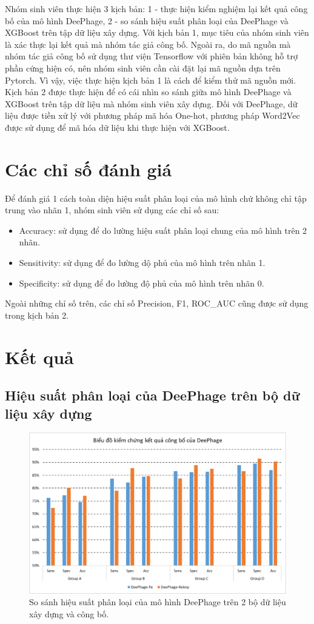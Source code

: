 Nhóm sinh viên thực hiện 3 kịch bản: 1 - thực hiện kiểm nghiệm lại kết quả công bố của mô hình DeePhage, 2 - so sánh hiệu suất phân loại của DeePhage và XGBoost trên tập dữ liệu xây dựng. Với kịch bản 1, mục tiêu của nhóm sinh viên là xác thực lại kết quả mà nhóm tác giả công bố. Ngoài ra, do mã nguồn mà nhóm tác giả công bố sử dụng thư viện Tensorflow với phiên bản không hỗ trợ phần cứng hiện có, nên nhóm sinh viên cần cài đặt lại mã nguồn dựa trên Pytorch. Vì vậy, việc thực hiện kịch bản 1 là cách để kiểm thử mã nguồn mới. Kịch bản 2 được thực hiện để có cái nhìn so sánh giữa mô hình DeePhage và XGBoost trên tập dữ liệu mà nhóm sinh viên xây dựng. Đối với DeePhage, dữ liệu được tiền xử lý với phương pháp mã hóa One-hot, phương pháp Word2Vec được sử dụng để mã hóa dữ liệu khi thực hiện với XGBoost.

\section{Các chỉ số đánh giá}
Để đánh giá 1 cách toàn diện hiệu suất phân loại của mô hình chứ không chỉ tập trung vào nhãn 1, nhóm sinh viên sử dụng các chỉ số sau:
\begin{itemize}
    \item Accuracy: sử dụng để do lường hiệu suất phân loại chung của mô hình trên 2 nhãn.
    \item Sensitivity: sử dụng để đo lường dộ phủ của mô hình trên nhãn 1.
    \item Specificity: sử dụng để đo lường độ phủ của mô hình trên nhãn 0.
\end{itemize}
Ngoài những chỉ số trên, các chỉ số Precision, F1, ROC\_AUC cũng được sử dụng trong kịch bản 2.

\section{Kết quả}
\subsection{Hiệu suất phân loại của DeePhage trên bộ dữ liệu xây dựng}

\begin{figure}[H]
    \centering
    \includegraphics[width=1\linewidth]{figures/result_verify_deephage.png}
    \caption{So sánh hiệu suất phân loại của mô hình DeePhage trên 2 bộ dữ liệu xây dựng và công bố.}
    \label{fig:result_1}
\end{figure}

